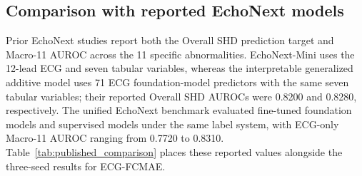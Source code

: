 \BSPCseparateresultfloatgroups

\subsection{Comparison with reported EchoNext models}
\label{sec:results_published_comparison}

Prior EchoNext studies report both the Overall SHD prediction target and Macro-11 AUROC across the 11 specific abnormalities. EchoNext-Mini uses the 12-lead ECG and seven tabular variables, whereas the interpretable generalized additive model uses 71 ECG foundation-model predictors with the same seven tabular variables; their reported Overall SHD AUROCs were 0.8200 and 0.8280, respectively\cite{hughes2026echonextmini,zhou2026gamshd}. The unified EchoNext benchmark evaluated fine-tuned foundation models and supervised models under the same label system, with ECG-only Macro-11 AUROC ranging from 0.7720 to 0.8310\cite{almasud2026benchmark}. Table~\ref{tab:published_comparison} places these reported values alongside the three-seed results for ECG-FCMAE.

